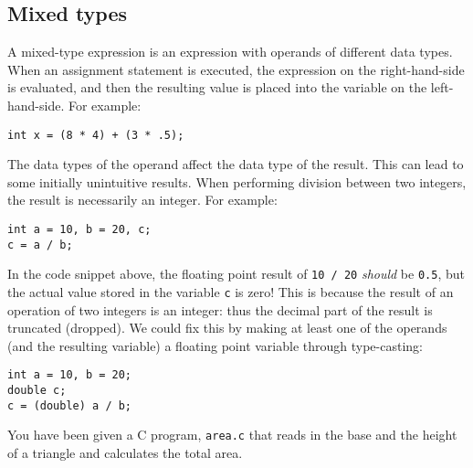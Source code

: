 \documentclass[12pt]{scrartcl}
\begin{document}
\subsection{Mixed types}

A mixed-type expression is an expression with operands of different
data types. When an assignment statement is executed, the expression
on the right-hand-side is evaluated, and then the resulting value is
placed into the variable on the left-hand-side.  For example:

\begin{verbatim}
int x = (8 * 4) + (3 * .5);
\end{verbatim}

The data types of the operand affect the data type of the result.  This
can lead to some initially unintuitive results.  When performing division
between two integers, the result is necessarily an integer.  For example:

\begin{verbatim}
int a = 10, b = 20, c;
c = a / b;
\end{verbatim}

In the code snippet above, the floating point result of \texttt{10 / 20}
\emph{should} be \texttt{0.5}, but the actual value stored in the
variable \texttt{c} is zero!  This is because the result of an operation
of two integers is an integer: thus the decimal part of the result is truncated
(dropped).  We could fix this by making at least one of the operands (and
the resulting variable) a floating point variable through type-casting:

\begin{verbatim}
int a = 10, b = 20;
double c;
c = (double) a / b;
\end{verbatim}

You have been given a C program, \texttt{area.c} that reads
in the base and the height of a triangle and calculates the total area.
\end{document}
